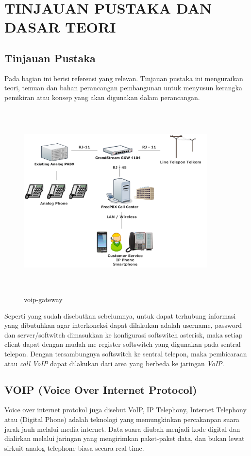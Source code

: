 \documentclass{jtetiproposalskripsi}
\begin{document}
\chapter{TINJAUAN PUSTAKA DAN DASAR TEORI}                

\section{Tinjauan Pustaka}
Pada bagian ini berisi referensi yang relevan. Tinjauan pustaka ini menguraikan teori, temuan dan bahan perancangan pembangunan untuk menyusun kerangka pemikiran atau konsep yang akan digunakan dalam perancangan.

\begin{figure}[!htbp]
\centering
\includegraphics[width=10cm,height=10cm]{gambar/voip-gateway}
\caption{voip-gateway}
\label{penanda}
\end{figure}

Seperti yang sudah disebutkan sebelumnya, untuk dapat terhubung informasi yang dibutuhkan  agar interkoneksi dapat dilakukan adalah username, password dan  server/softwitch dimasukkan ke konfigurasi softswitch asterisk, maka setiap client dapat dengan mudah me-register softswitch yang digunakan pada sentral telepon. Dengan tersambungnya softswitch ke sentral telepon, maka pembicaraan atau \emph{call VoIP} dapat dilakukan dari area yang berbeda ke jaringan \emph{VoIP}.

\section{VOIP (Voice Over Internet Protocol)}
Voice over internet protokol juga disebut VoIP, IP Telephony, Internet Telephony atau (Digital Phone) adalah teknologi yang memungkinkan percakanpan suara jarak jauh melalui media internet. Data suara diubah menjadi kode digital dan dialirkan melalui jaringan yang mengirimkan paket-paket data, dan bukan lewat sirkuit analog telephone biasa secara real time.
\end{document}
